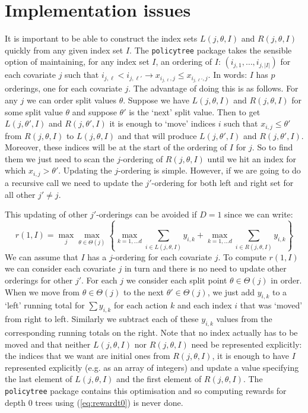 \documentclass{article}
\newcommand{\splitval}{\ensuremath{\theta}}
\newcommand{\splitvals}{\ensuremath{\Theta}}
\newcommand{\depth}{\ensuremath{D}}
\begin{document}
\section{Implementation issues}
\label{sec:implementation}

It is important to be able to construct the index sets
$L(j,\splitval,I)$ and $R(j,\splitval,I)$ quickly from any given index
set $I$. The \texttt{policytree} package takes the sensible option of
maintaining, for any index set $I$, an ordering of $I$:
$(i_{j,1}, \dots, i_{j,|I|})$ for each covariate $j$ such that
$i_{j,\ell} < i_{j,\ell'} \rightarrow x_{i_{j,\ell},j} \leq
x_{i_{j,\ell'},j}$. In words: $I$ has $p$ orderings, one for each
covariate $j$. The advantage of doing this is as follows. For any $j$
we can order split values $\theta$. Suppose we have $L(j,\splitval,I)$
and $R(j,\splitval,I)$ for some split value $\splitval$ and suppose
$\splitval'$ is the `next' split value. Then to get
$L(j,\splitval',I)$ and $R(j,\splitval',I)$ it is enough to `move'
indices $i$ such that $x_{i,j} \leq \splitval'$ from $R(j,\splitval,I)$
to $L(j,\splitval,I)$ and that will produce $L(j,\splitval',I)$ and
$R(j,\splitval',I)$. Moreover, these indices will be at the start of
the ordering of $I$ for $j$. So to find them we just need to scan the
$j$-ordering of $R(j,\splitval,I)$ until we hit an index for which
$x_{i,j} > \splitval'$. Updating the $j$-ordering is
simple. However, if we are going to do a recursive call we need to
update the $j'$-ordering for both left and right set for all other $j'
\neq j$.


This updating of other $j'$-orderings can be avoided if $\depth = 1$
since we can write:
\begin{equation}
  \label{eq:depthone}
  r(1,I) = \max_{j}\max_{\splitval \in \splitvals(j)} \left\{ \max_{k=1,\dots d} \sum_{i \in
     L(j,\splitval,I) } y_{i,k} + \max_{k=1,\dots d} \sum_{i \in R(j,\splitval,I)} y_{i,k} \right\}
\end{equation}
We can assume that $I$ has a $j$-ordering for each covariate $j$.  To
compute $r(1,I)$ we can consider each covariate $j$ in turn and there
is no need to update other orderings for other $j'$. For each $j$ we
consider each split point $\splitval \in \splitvals(j)$ in order. When
we move from $\splitval \in \splitvals(j)$ to the next
$\splitval' \in \splitvals(j)$, we just add $y_{i,k}$ to a `left'
running total for $\sum y_{i,k}$ for each action $k$ and each index
$i$ that was `moved' from right to left. Similarly we subtract each of
these $y_{i,k}$ values from the corresponding running totals on the
right. Note that no index actually
has to be moved and that neither $L(j,\splitval,I)$ nor
$R(j,\splitval,I)$ need be represented explicitly: the indices that we
want are initial ones from $R(j,\splitval,I)$, it is enough to have
$I$ represented explicitly (e.g. as an array of integers) and update
a value specifying the last element of $L(j,\splitval,I)$ and the
first element of $R(j,\splitval,I)$.   The \texttt{policytree} package contains this optimisation and
so computing rewards for depth 0 trees using (\ref{eq:rewardt0}) is
never done.
\end{document}
